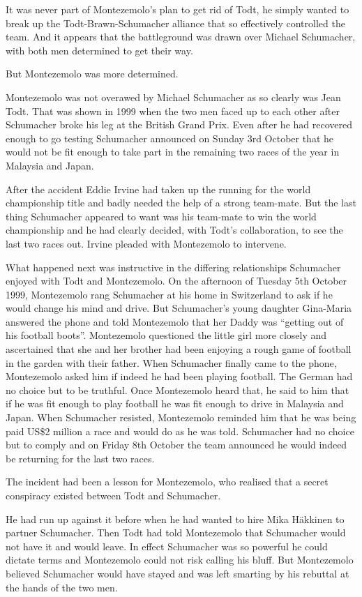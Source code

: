\documentclass{article}
\begin{document}
It was never part of Montezemolo’s plan to get rid of Todt, he simply wanted to break up the Todt-Brawn-Schumacher alliance that so effectively controlled the team. And it appears that the battleground was drawn over Michael Schumacher, with both men determined to get their way.

But Montezemolo was more determined.

Montezemolo was not overawed by Michael Schumacher as so clearly was Jean Todt. That was shown in 1999 when the two men faced up to each other after Schumacher broke his leg at the British Grand Prix. Even after he had recovered enough to go testing Schumacher announced on Sunday 3rd October that he would not be fit enough to take part in the remaining two races of the year in Malaysia and Japan.

After the accident Eddie Irvine had taken up the running for the world championship title and badly needed the help of a strong team-mate. But the last thing Schumacher appeared to want was his team-mate to win the world championship and he had clearly decided, with Todt’s collaboration, to see the last two races out. Irvine pleaded with Montezemolo to intervene.

What happened next was instructive in the differing relationships Schumacher enjoyed with Todt and Montezemolo. On the afternoon of Tuesday 5th October 1999, Montezemolo rang Schumacher at his home in Switzerland to ask if he would change his mind and drive. But Schumacher’s young daughter Gina-Maria answered the phone and told Montezemolo that her Daddy was “getting out of his football boots”. Montezemolo questioned the little girl more closely and ascertained that she and her brother had been enjoying a rough game of football in the garden with their father. When Schumacher finally came to the phone, Montezemolo asked him if indeed he had been playing football. The German had no choice but to be truthful. Once Montezemolo heard that, he said to him that if he was fit enough to play football he was fit enough to drive in Malaysia and Japan. When Schumacher resisted, Montezemolo reminded him that he was being paid US\$2 million a race and would do as he was told. Schumacher had no choice but to comply and on Friday 8th October the team announced he would indeed be returning for the last two races.

The incident had been a lesson for Montezemolo, who realised that a secret conspiracy existed between Todt and Schumacher.

He had run up against it before when he had wanted to hire Mika Häkkinen to partner Schumacher. Then Todt had told Montezemolo that Schumacher would not have it and would leave. In effect Schumacher was so powerful he could dictate terms and Montezemolo could not risk calling his bluff. But Montezemolo believed Schumacher would have stayed and was left smarting by his rebuttal at the hands of the two men.
\end{document}
